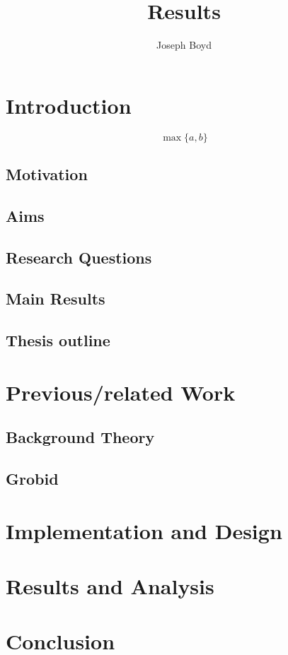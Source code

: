 \documentclass[11pt, oneside]{scrartcl}   	%
\title{Results}
\author{Joseph Boyd}
\begin{document}
\maketitle

\tableofcontents

\section{Introduction} %
$$\max\{a, b\}$$
\subsection{Motivation}
\subsection{Aims}
\subsection{Research Questions}
\subsection{Main Results}
\subsection{Thesis outline}

\section{Previous/related Work}
\subsection{Background Theory}
\subsection{Grobid}

\section{Implementation and Design}

\section{Results and Analysis}

\section{Conclusion}
\end{document}
